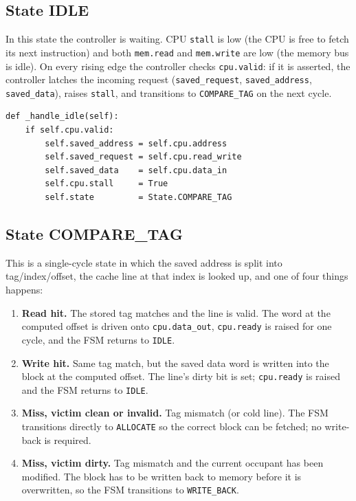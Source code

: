 \documentclass[11pt,a4paper]{article}
\begin{document}
\subsection{State IDLE}

In this state the controller is waiting. CPU \texttt{stall} is low (the CPU
is free to fetch its next instruction) and both \texttt{mem.read} and
\texttt{mem.write} are low (the memory bus is idle). On every rising edge the
controller checks \texttt{cpu.valid}: if it is asserted, the controller
latches the incoming request (\texttt{saved\_request}, \texttt{saved\_address},
\texttt{saved\_data}), raises \texttt{stall}, and transitions to
\texttt{COMPARE\_TAG} on the next cycle.

\begin{lstlisting}
def _handle_idle(self):
    if self.cpu.valid:
        self.saved_address = self.cpu.address
        self.saved_request = self.cpu.read_write
        self.saved_data    = self.cpu.data_in
        self.cpu.stall     = True
        self.state         = State.COMPARE_TAG
\end{lstlisting}

\subsection{State COMPARE\_TAG}

This is a single-cycle state in which the saved address is split into
tag/index/offset, the cache line at that index is looked up, and one of four
things happens:

\begin{enumerate}[leftmargin=1.4em,itemsep=0.15em]
    \item \textbf{Read hit.} The stored tag matches and the line is valid.
    The word at the computed offset is driven onto \texttt{cpu.data\_out},
    \texttt{cpu.ready} is raised for one cycle, and the FSM returns to
    \texttt{IDLE}.
    \item \textbf{Write hit.} Same tag match, but the saved data word is
    written into the block at the computed offset. The line's dirty bit is
    set; \texttt{cpu.ready} is raised and the FSM returns to \texttt{IDLE}.
    \item \textbf{Miss, victim clean or invalid.} Tag mismatch (or cold
    line). The FSM transitions directly to \texttt{ALLOCATE} so the correct
    block can be fetched; no write-back is required.
    \item \textbf{Miss, victim dirty.} Tag mismatch and the current occupant
    has been modified. The block has to be written back to memory before it
    is overwritten, so the FSM transitions to \texttt{WRITE\_BACK}.
\end{enumerate}
\end{document}
